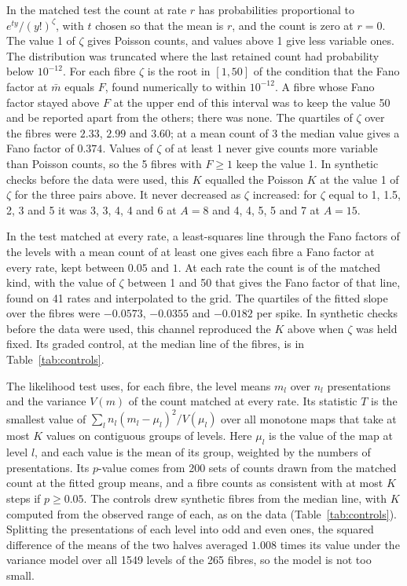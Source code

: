 In the matched test the count at rate $r$ has probabilities proportional to $e^{ty}/(y!)^{\zeta}$, with $t$ chosen so that the mean is
$r$, and the count is zero at $r=0$. The value 1 of $\zeta$ gives Poisson counts, and values above 1 give less variable ones. The
distribution was truncated where the last retained count had probability below $10^{-12}$. For each fibre $\zeta$ is the root in
$[1,50]$ of the condition that the Fano factor at $\bar m$ equals $F$, found numerically to within $10^{-12}$. A fibre whose Fano factor
stayed above $F$ at the upper end of this interval was to keep the value 50 and be reported apart from the others; there was none. The
quartiles of $\zeta$ over the fibres were $2.33$, $2.99$ and $3.60$; at a mean count of 3 the median value gives a Fano factor of
$0.374$. Values of $\zeta$ of at least 1 never give counts more variable than Poisson counts, so the 5 fibres with $F\ge1$ keep the
value 1. In synthetic checks before the data were used, this $K$ equalled
the Poisson $K$ at the value 1 of $\zeta$ for the three pairs above. It never decreased as $\zeta$ increased: for $\zeta$ equal to 1,
1.5, 2, 3 and 5 it was 3, 3, 4, 4 and 6 at $A=8$ and 4, 4, 5, 5 and 7 at $A=15$.

In the test matched at every rate, a least-squares line through the Fano factors of the levels with a mean count of at least one
gives each fibre a Fano factor at every rate, kept between $0.05$ and $1$. At each rate the count is of the matched kind,
with the value of $\zeta$ between 1 and 50 that gives the Fano factor of that line, found on 41 rates and interpolated
to the grid. The quartiles of the fitted slope over the fibres were $-0.0573$, $-0.0355$ and $-0.0182$ per spike. In synthetic checks
before the data were used, this channel reproduced the $K$ above when $\zeta$ was held fixed. Its graded control, at the median line of the fibres, is in Table~\ref{tab:controls}.

The likelihood test uses, for each fibre, the level means $m_l$ over $n_l$ presentations and the variance $V(m)$ of the count matched
at every rate. Its statistic $T$ is the smallest value of $\sum_l n_l(m_l-\mu_l)^2/V(\mu_l)$ over all monotone maps that take at most $K$ values
on contiguous groups of levels. Here $\mu_l$ is the value of the map at level $l$, and each value is the mean of its group, weighted
by the numbers of presentations. Its $p$-value comes
from 200 sets of counts drawn from the matched count at the fitted group means, and a fibre counts as consistent with at most $K$
steps if $p\ge0.05$. The controls drew synthetic fibres from the median line, with $K$ computed from the observed range of each,
as on the data (Table~\ref{tab:controls}). Splitting the presentations of each level into odd and even ones, the squared difference of
the means of the two halves averaged $1.008$ times its value under the variance model over all 1549 levels of the 265 fibres, so the model is not too small.

